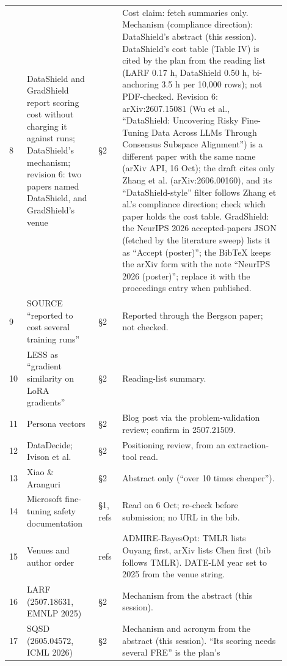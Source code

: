 \documentclass{article}
\theoremstyle{plain}
\theoremstyle{definition}
\theoremstyle{remark}
\begin{document}
\begin{longtable}{@{}L{0.03\linewidth}L{0.24\linewidth}L{0.08\linewidth}L{0.55\linewidth}@{}}
  8 & DataShield and GradShield report scoring cost without charging it against
      runs; DataShield's mechanism; revision 6: two papers named DataShield, and
      GradShield's venue & \S{}2 & Cost claim: fetch summaries only. Mechanism
      (compliance direction): DataShield's abstract (this session). DataShield's
      cost table (Table IV) is cited by the plan from the reading list (LARF
      0.17 h, DataShield 0.50 h, bi-anchoring 3.5 h per 10,000 rows); not
      PDF-checked. Revision 6: arXiv:2607.15081 (Wu et al., ``DataShield:
      Uncovering Risky Fine-Tuning Data Across LLMs Through Consensus Subspace
      Alignment'') is a different paper with the same name (arXiv API, 16 Oct);
      the draft cites only Zhang et al. (arXiv:2606.00160), and its
      ``DataShield-style'' filter follows Zhang et al.'s compliance direction;
      check which paper holds the cost table. GradShield: the NeurIPS 2026
      accepted-papers JSON (fetched by the literature sweep) lists it as
      ``Accept (poster)''; the BibTeX keeps the arXiv form with the note
      ``NeurIPS 2026 (poster)''; replace it with the proceedings entry when
      published. \\
  9 & SOURCE ``reported to cost several training runs'' & \S{}2 & Reported
      through the Bergson paper; not checked. \\
  10 & LESS as ``gradient similarity on LoRA gradients'' & \S{}2 & Reading-list
      summary. \\
  11 & Persona vectors & \S{}2 & Blog post via the problem-validation review;
      confirm in 2507.21509. \\
  12 & DataDecide; Ivison et al. & \S{}2 & Positioning review, from an
      extraction-tool read. \\
  13 & Xiao \& Aranguri & \S{}2 & Abstract only (``over 10 times cheaper''). \\
  14 & Microsoft fine-tuning safety documentation & \S{}1, refs & Read on 6 Oct;
      re-check before submission; no URL in the bib. \\
  15 & Venues and author order & refs & ADMIRE-BayesOpt: TMLR lists Ouyang
      first, arXiv lists Chen first (bib follows TMLR). DATE-LM year set to 2025
      from the venue string. \\
  16 & LARF (2507.18631, EMNLP 2025) & \S{}2 & Mechanism from the abstract (this
      session). \\
  17 & SQSD (2605.04572, ICML 2026) & \S{}2 & Mechanism and acronym from the
      abstract (this session). ``Its scoring needs several FRE'' is the plan's

\end{longtable}
\end{document}
